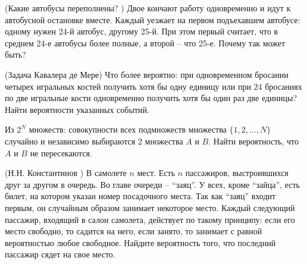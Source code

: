 \begin{comment}
\begin{problem}
В самолете $n$ мест. Есть $n$ пассажиров, выстроившихся друг за другом в очередь. Во главе очереди -- <<заяц>>. У всех, 
кроме <<зайца>>, есть билет, на котором указан номер посадочного места. Так как <<заяц>> входит первым, он случайным образом занимает 
некоторое место. Каждый следующий пассажир, входящий в салон самолета, действует по такому принципу: если его место свободно, то 
садится на него, если занято, то занимает с равной вероятностью любое свободное. Найдите вероятность того, что последний пассажир 
сядет на свое место. 
\end{problem}
\end{comment}


\begin{problem}(Какие автобусы переполнены? \cite{book2012}) Двое кончают работу 
одновременно и идут к автобусной остановке вместе. Каждый уезжает на первом 
подъехавшем автобусе: одному нужен 24-й автобус, другому 25-й. При этом 
первый считает, что в среднем 24-е автобусы более полные, а второй -- что 
25-е. Почему так может быть?
\end{problem}

\begin{problem}(Задача Кавалера де Мере) 
Что более вероятно: при одновременном бросании четырех игральных костей получить хотя бы одну единицу или при $24$ бросаниях 
 по две игральные кости одновременно получить хотя бы один раз две единицы? Найти вероятности указанных событий. 
\end{problem}


\begin{problem}
Из $2^N$ множеств: совокупности всех подмножеств множества $\{1,2,\ldots,N\}$ случайно и независимо выбираются 2 множества $A$ и $B$. Найти вероятность, что $A$ и $B$ не пересекаются.
\end{problem}

\begin{problem}(Н.Н. Константинов \cite{book2012})
В самолете $n$ мест. Есть $n$ пассажиров, выстроившихся друг за другом в очередь. Во главе очереди -- ``заяц''. У всех, 
кроме ``зайца'', есть билет, на котором указан номер посадочного места. Так как ``заяц'' входит первым, он случайным образом занимает 
некоторое место. Каждый следующий пассажир, входящий в салон самолета, действует по такому принципу: если его место свободно, то 
садится на него, если занято, то занимает с равной вероятностью любое свободное. Найдите вероятность того, что последний пассажир 
сядет на свое место. 
\end{problem}


